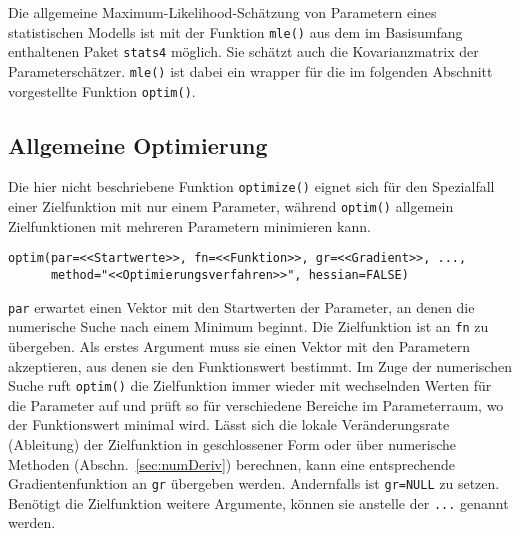 Die allgemeine Maximum-Likelihood-Schätzung von Parametern eines statistischen Modells ist mit der Funktion \lstinline!mle()! aus dem im Basisumfang enthaltenen Paket \lstinline!stats4! möglich. Sie schätzt auch die Kovarianzmatrix der Parameterschätzer. \lstinline!mle()! ist dabei ein wrapper für die im folgenden Abschnitt vorgestellte Funktion \lstinline!optim()!.

\subsection{Allgemeine Optimierung}
\label{sec:optimize}

Die hier nicht beschriebene Funktion \lstinline!optimize()! eignet sich für den Spezialfall einer Zielfunktion mit nur einem Parameter, während \lstinline!optim()! allgemein Zielfunktionen mit mehreren Parametern minimieren kann.
\begin{lstlisting}
optim(par=<<Startwerte>>, fn=<<Funktion>>, gr=<<Gradient>>, ...,
      method="<<Optimierungsverfahren>>", hessian=FALSE)
\end{lstlisting}

\lstinline!par! erwartet einen Vektor mit den Startwerten der Parameter, an denen die numerische Suche nach einem Minimum beginnt. Die Zielfunktion ist an \lstinline!fn! zu übergeben. Als erstes Argument muss sie einen Vektor mit den Parametern akzeptieren, aus denen sie den Funktionswert bestimmt. Im Zuge der numerischen Suche ruft \lstinline!optim()! die Zielfunktion immer wieder mit wechselnden Werten für die Parameter auf und prüft so für verschiedene Bereiche im Parameterraum, wo der Funktionswert minimal wird. Lässt sich die lokale Veränderungsrate (Ableitung) der Zielfunktion in geschlossener Form oder über numerische Methoden (Abschn.\ \ref{sec:numDeriv}) berechnen, kann eine entsprechende Gradientenfunktion an \lstinline!gr! übergeben werden. Andernfalls ist \lstinline!gr=NULL! zu setzen. Benötigt die Zielfunktion weitere Argumente, können sie anstelle der \lstinline!...! genannt werden.

